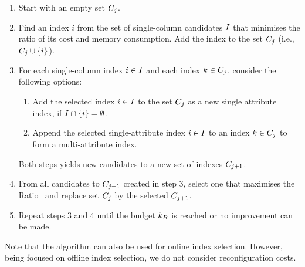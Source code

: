 \begin{enumerate}
    \item Start with an empty set $C_{j}$.
    \item Find an index $i$ from the set of single-column candidates $I$ that minimises the ratio of its cost and memory consumption. Add the index to the set $C_{j}$ (i.e., $C_{j} \cup \{i\}$).
    \item For each single-column index $i \in I$ and each index $k \in C_{j}$, consider the following options:
    \begin{enumerate}
        \item Add the selected index $i \in I$ to the set $C_{j}$ as a new single attribute index, if $I \cap \{i\} = \emptyset$.
        \item Append the selected single-attribute index $i \in I$ to an index $k \in C_{j}$ to form a multi-attribute index.
    \end{enumerate}
    Both steps yields new candidates to a new set of indexes $C_{j+1}$.
    \item From all candidates to $C_{j+1}$ created in step 3, select one that maximises the Ratio~ and replace set $C_{j}$ by the selected $C_{j+1}$.
    \item Repeat steps 3 and 4 until the budget $k_B$ is reached or no improvement can be made.
\end{enumerate}

Note that the algorithm can also be used for online index selection. However, being focused on offline index selection, we do not consider reconfiguration costs.

